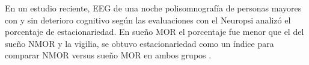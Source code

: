 

En un estudio reciente, EEG de una noche polisomnografía de personas mayores con y sin deterioro cognitivo según las evaluaciones con el Neuropsi analizó el porcentaje de estacionariedad.  En sueño MOR el porcentaje fue menor que el del sueño NMOR y la vigilia, se obtuvo estacionariedad  como un índice para comparar NMOR versus sueño MOR en ambos grupos \cite{ROSALESLAGARDE2017}.

%
%

